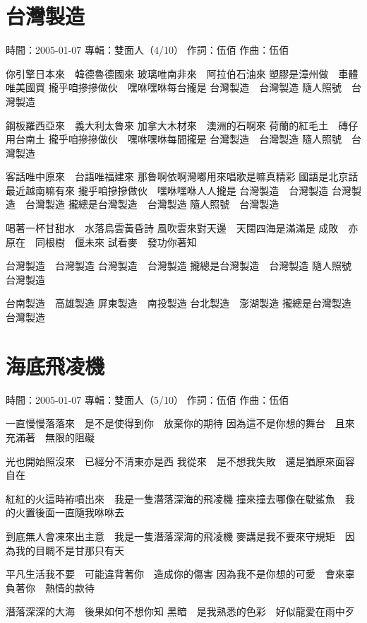 \documentclass[UTF8,a4paper,oneside,twocolumn,12pt]{ctexbook}
\newcommand{\infopair}[2]{\textbullet #1：#2}
\newcommand{\zc}[1][伍佰]{\infopair{作詞}{#1}}
\newcommand{\zq}[1][伍佰]{\infopair{作曲}{#1}}
\newcommand{\zj}[1]{\infopair{專輯}{#1}}
\newcommand{\sj}[1]{\infopair{時間}{#1}}
\newenvironment{info}{\begin{flushleft}\kaishu
	}
	{\end{flushleft}\normalsize\yahei\par}
\newenvironment{lyric}{
	}
{}
\begin{document}
\section{台灣製造}
\begin{info}
	\sj{2005-01-07}
	\zj{雙面人（4/10）}
	\zc
	\zq
\end{info}
\begin{lyric}
	你引擎日本來　韓德魯德國來
	玻璃唯南非來　阿拉伯石油來
	塑膠是漳州做　車體唯美國買
	攏乎咱摻摻做伙　嘿咻嘿咻每台攏是
	台灣製造　台灣製造
	隨人照號　台灣製造

	鋼板羅西亞來　義大利太魯來
	加拿大木材來　澳洲的石啊來
	荷蘭的紅毛土　磚仔用台南土
	攏乎咱摻摻做伙　嘿咻嘿咻每間攏是
	台灣製造　台灣製造
	隨人照號　台灣製造

	客話唯中原來　台語唯福建來
	那魯啊依啊灣嘟用來唱歌是嘛真精彩
	國語是北京話　最近越南嘛有來
	攏乎咱摻摻做伙　嘿咻嘿咻人人攏是
	台灣製造　台灣製造
	台灣製造　台灣製造
	攏總是台灣製造　台灣製造
	隨人照號　台灣製造

	喝著一杯甘甜水　水落烏雲黃昏詩
	風吹雲來對天邊　天闊四海是滿滿是
	成敗　亦原在　同根樹　偃未來
	試看麥　發功你著知

	台灣製造　台灣製造
	台灣製造　台灣製造
	攏總是台灣製造　台灣製造
	隨人照號　台灣製造

	台南製造　高雄製造
	屏東製造　南投製造
	台北製造　澎湖製造
	攏總是台灣製造　台灣製造
\end{lyric}

\section{海底飛凌機}
\begin{info}
	\sj{2005-01-07}
	\zj{雙面人（5/10）}
	\zc
	\zq
\end{info}
\begin{lyric}
	一直慢慢落落來　是不是使得到你　放棄你的期待
	因為這不是你想的舞台　且來充滿著　無限的阻礙

	光也開始照沒來　已經分不清東亦是西
	我從來　是不想我失敗　還是猶原來面容自在

	紅紅的火這時袸噴出來　我是一隻潛落深海的飛凌機
	撞來撞去哪像在駛鯊魚　我的火置後面一直隨我咻咻去

	到底無人會凍來出主意　我是一隻潛落深海的飛凌機
	麥講是我不要來守規矩　因為我的目睭不是甘那只有天

	平凡生活我不要　可能違背著你　造成你的傷害
	因為我不是你想的可愛　會來辜負著你　熱情的款待

	潛落深深的大海　後果如何不想你知
	黑暗　是我熟悉的色彩　好似龍愛在雨中歹
\end{lyric}
\end{document}
